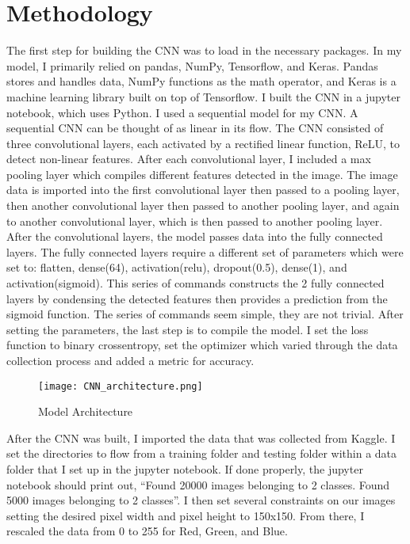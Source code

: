 \documentclass[12pt,english]{article}
\begin{document}
\section{Methodology}
The first step for building the CNN was to load in the necessary packages. In my model, I primarily relied on pandas, NumPy, Tensorflow, and Keras. Pandas stores and handles data, NumPy functions as the math operator, and Keras is a machine learning library built on top of Tensorflow. I built the CNN in a jupyter notebook, which uses Python. I used a sequential model for my CNN. A sequential CNN can be thought of as linear in its flow. The CNN consisted of three convolutional layers, each activated by a rectified linear function, ReLU, to detect non-linear features. After each convolutional layer, I included a max pooling layer which compiles different features detected in the image. The image data is imported into the first convolutional layer then passed to a pooling layer, then another convolutional layer then passed to another pooling layer, and again to another convolutional layer, which is then passed to another pooling layer. After the convolutional layers, the model passes data into the fully connected layers. The fully connected layers require a different set of parameters which were set to: flatten, dense(64), activation(relu), dropout(0.5), dense(1), and activation(sigmoid). This series of commands constructs the 2 fully connected layers by condensing the detected features then provides a prediction from the sigmoid function. The series of commands seem simple, they are not trivial. After setting the parameters, the last step is to compile the model. I set the loss function to binary crossentropy, set the optimizer which varied through the data collection process and added a metric for accuracy. \par

\begin{figure}[h!]
\centering
\texttt{[image: CNN\_architecture.png]}
\caption{Model Architecture}
\label{fig:universe}
\end{figure}

After the CNN was built, I imported the data that was collected from Kaggle. I set the directories to flow from a training folder and testing folder within a data folder that I set up in the jupyter notebook. If done properly, the jupyter notebook should print out, “Found 20000 images belonging to 2 classes. Found 5000 images belonging to 2 classes”. I then set several constraints on our images setting the desired pixel width and pixel height to 150x150. From there, I rescaled the data from 0 to 255 for Red, Green, and Blue. \par
\end{document}
